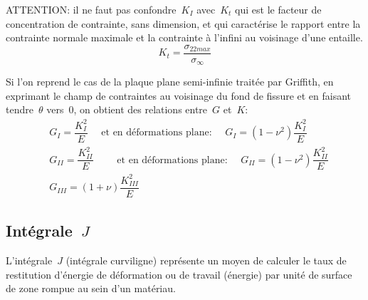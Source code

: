 \medskip
{}
ATTENTION: il ne faut pas confondre~$K_I$ avec~$K_t$ qui est le facteur de concentration
de contrainte, sans dimension, et qui caractérise le rapport entre la contrainte normale
maximale et la contrainte à l'infini au voisinage d'une entaille.
\begin{equation} K_t = \dfrac{\sigma_{22 max}}{\sigma_\infty} \end{equation}

\medskip
Si l'on reprend le cas de la plaque plane semi-infinie traitée par Griffith,
en exprimant le champ de contraintes au voisinage du fond de fissure et en faisant tendre~$\theta$ vers~$0$,
on obtient des relations entre~$G$ et~$K$:
\begin{align}
&G_I = \dfrac{K_I^2}E \quad \text{ et en déformations plane: }\quad
G_I = (1-\nu^2)\dfrac{K_I^2}E \\
&G_{II} = \dfrac{K_{II}^2}E \qquad \text{ et en déformations plane: }\quad
G_{II} = (1-\nu^2)\dfrac{K_{II}^2}E \\
&G_{III} = (1+\nu)\dfrac{K_{III}^2}E
\end{align}

\medskip
\subsection{Intégrale~$J$}

\medskip
L'intégrale~$J$ (intégrale curviligne) représente un moyen de calculer le taux de restitution d'énergie
de déformation ou de travail (énergie) par unité de surface de zone rompue au sein d'un matériau.

